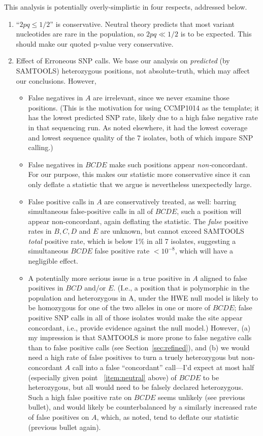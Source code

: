 \documentclass{article}\usepackage[]{graphicx}\usepackage[]{color}
\begin{document}
This analysis is potentially overly-simplistic in four respects, addressed below. 
\begin{enumerate}
  \item \label{item:neutral}``$2pq\leq1/2$'' is conservative.  Neutral theory predicts that most variant nucleotides are rare in the population, so $2pq \ll 1/2$ is to be expected.  This should make our quoted p-value very conservative.
  \item Effect of Erroneous SNP calls.  We base our analysis on \emph{predicted} (by SAMTOOLS) heterozygous positions, not absolute-truth, which may affect our conclusions.  However, 
  \begin{itemize} 
    \item False negatives in $A$ are irrelevant, since we never examine those positions.  (This is the motivation for using CCMP1014 as the template; it has the lowest predicted SNP rate, likely due to a high false negative rate in that sequencing run.  As noted elsewhere, it had the lowest coverage and lowest sequence quality of the 7 isolates, both of which impare SNP calling.)
    \item False negatives in $BCDE$ make such positions appear \emph{non-}concordant.  For our purpose, this makes our statistic more conservative since it can only deflate a statistic that we argue is nevertheless unexpectedly large.
    \item False positive calls in $A$ are conservatively treated, as well: barring simultaneous false-positive calls in all of $BCDE$, such a position will appear non-concordant, again deflating the statistic.  The \emph{false} positive rates in $B,C,D$ and $E$ are unknown, but cannot exceed SAMTOOLS \emph{total} positive rate, which is below 1\% in all 7 isolates, suggesting a simultaneous $BCDE$ false positive rate $<10^{-8}$, which will have a negligible effect.
    \item A potentially more serious issue is a true positive in $A$ aligned to false positives in $BCD$ and/or $E$.  (I.e., a position that is polymorphic in the population and heterozygous in A, under the HWE null model is likely to be homozygous for one of the two alleles in one or more of $BCDE$; false positive SNP calls in all of those isolates would make the site appear concordant, i.e., provide evidence against the null model.) However, (a) my impression is that SAMTOOLS is more prone to false negative calls than to false positive calls (see Section~\ref{sec:refined}), and (b) we would need a high rate of false positives to turn a truely heterozygous but non-concordant $A$ call into a false ``concordant'' call---I'd expect at most half (especially given point ~\ref{item:neutral} above) of $BCDE$ to be heterozygous, but all would need to be falsely declared heterozygous. Such a high false positive rate on $BCDE$ seems unlikely (see previous bullet), and would likely be counterbalanced by a similarly increased rate of false positives on $A$, which, as noted, tend to deflate our statistic (previous bullet again). 

\end{itemize}
\end{enumerate}
\end{document}
